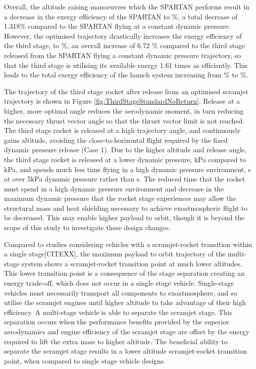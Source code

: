 Overall, the altitude raising manoeuvres which the SPARTAN performs result in a decrease in the exergy efficiency of the SPARTAN to \secondExergyEffStandardNoReturn \%, a total decrease of 1.318\% compared to the SPARTAN flying at a constant dynamic pressure. However, the optimised trajectory drastically increases the exergy efficiency of the third stage, to \thirddExergyEffStandardNoReturn \%, an overall increase of 6.72 \% compared to the third stage released from the SPARTAN flying a constant dynamic pressure trajectory, so that the third stage is utilising its available energy 1.61 times as efficiently.  
This leads to the total exergy efficiency of the launch system increasing from \totalExergyEffConstq \% to \totalExergyEffStandardNoReturn \%. 

The trajectory of the third stage rocket after release from an optimised scramjet trajectory is shown in Figure \ref{fig:ThirdStageStandardNoReturn}. Release at a higher, more optimal angle reduces the aerodynamic moment, in turn reducing the necessary thrust vector angle so that the thrust vector limit is not reached. The third stage rocket is released at a high trajectory angle, and continuously gains altitude, avoiding the close-to-horizontal flight required by the fixed dynamic pressure release (Case 1).
Due to the higher altitude and release angle, the third stage rocket is released at a lower dynamic pressure, \secondthirdSeparationqCdStandardNoReturn kPa compared to \secondthirdSeparationqConstq kPa, and spends much less time flying in a high dynamic pressure environment, \thirdqOverFiveStandard s at over 5kPa dynamic pressure rather than \thirdqOverFiveConstq s. 
The reduced time that the rocket must spend in a high dynamic pressure environment and decrease in the maximum dynamic pressure that the rocket stage experiences may allow the structural mass and heat shielding necessary to achieve exoatmospheric flight to be decreased. This may enable higher payload to orbit, though it is beyond the scope of this study to investigate these design changes. 


Compared to studies considering vehicles with a scramjet-rocket transition within a single stage\cite{Lu1993,Trefny1999}[CITEXX], the maximum payload to orbit trajectory of the multi-stage system shows a scramjet-rocket transition point at much lower altitudes.
This lower transition point is a consequence of the stage separation creating an energy trade-off, which does not occur in a single stage vehicle. Single-stage vehicles must necessarily transport all components to exoatmosphere, and so utilise the scramjet engines until higher altitude to take advantage of their high efficiency. A multi-stage vehicle is able to separate the scramjet stage. 
This separation occurs when the performance benefits provided by the superior aerodynamics and engine efficiency of the scramjet stage are offset by the energy required to lift the extra mass to higher altitude. The beneficial ability
to separate the scramjet stage results in a lower altitude scramjet-rocket transition point, when compared to single
stage vehicle designs.



